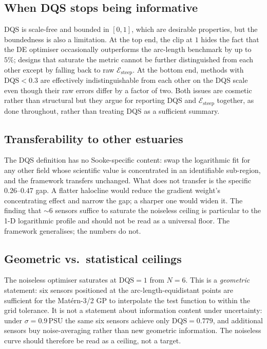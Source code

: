 \documentclass[11pt,letterpaper]{article}
\begin{document}
\subsection{When DQS stops being informative}
DQS is scale-free and bounded in $[0,1]$, which are desirable
properties, but the boundedness is also a limitation. At the top
end, the clip at $1$ hides the fact that the DE optimiser
occasionally outperforms the arc-length benchmark by up to $5\%$;
designs that saturate the metric cannot be further distinguished
from each other except by falling back to raw
$\mathcal{E}_{\text{steep}}$. At the bottom end, methods with
$\mathrm{DQS}<0.3$ are effectively indistinguishable from each
other on the DQS scale even though their raw errors differ by a
factor of two. Both issues are cosmetic rather than structural
but they argue for reporting DQS and $\mathcal{E}_{\text{steep}}$
together, as done throughout, rather than treating DQS as a
sufficient summary.

\subsection{Transferability to other estuaries}
The DQS definition has no Sooke-specific content: swap the
logarithmic fit for any other field whose scientific value is
concentrated in an identifiable sub-region, and the framework
transfers unchanged. What does not transfer is the specific
$0.26$--$0.47$ gap. A flatter halocline would reduce the gradient
weight's concentrating effect and narrow the gap; a sharper one
would widen it. The finding that $\sim 6$ sensors suffice to
saturate the noiseless ceiling is particular to the 1-D
logarithmic profile and should not be read as a universal floor.
The framework generalises; the numbers do not.

\subsection{Geometric vs.\ statistical ceilings}
The noiseless optimiser saturates at $\mathrm{DQS}=1$ from $N=6$. This
is a \emph{geometric} statement: six sensors positioned at the
arc-length-equidistant points are sufficient for the Mat\'ern-3/2 GP to
interpolate the test function to within the grid tolerance. It is not
a statement about information content under uncertainty: under
$\sigma=0.9\,\mathrm{PSU}$ the same six sensors achieve only
$\mathrm{DQS}=0.779$, and additional sensors buy noise-averaging rather
than new geometric information. The noiseless curve should therefore be
read as a ceiling, not a target.
\end{document}
